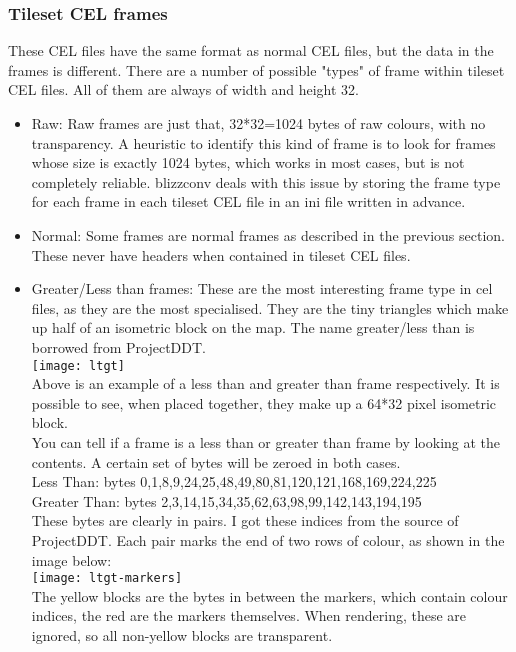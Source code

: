 \subsubsection{Tileset CEL frames}
	These CEL files have the same format as normal CEL files, but the data in the frames is different. There are a number of possible "types" of frame within tileset CEL files. All of them are always of width and height 32.
\begin{itemize}

	\item{Raw:} Raw frames are just that, 32*32=1024 bytes of raw colours, with no transparency. A heuristic to identify this kind of frame is to look for frames whose size is exactly 1024 bytes,  which works in most cases, but is not completely reliable. blizzconv\cite{blizzconv} deals with this issue by storing the frame type for each frame in each tileset CEL file in an ini file written in advance.
	
	\item{Normal:} Some frames are normal frames as described in the previous section. These never have headers when contained in tileset CEL files.
	
	\item{Greater/Less than frames:} These are the most interesting frame type in cel files, as they are the most specialised. They are the tiny triangles which make up half of an isometric block on the map. The name greater/less than is borrowed from ProjectDDT\cite{ddt}. \\
\texttt{[image: ltgt]}\\ Above is an example of a less than and greater than frame respectively. It is possible to  see, when placed together, they make up a 64*32 pixel isometric block.\\
You can tell if a frame is a less than or greater than frame by looking at the contents. A certain set of bytes will be zeroed in both cases.\\
Less Than: bytes 0,1,8,9,24,25,48,49,80,81,120,121,168,169,224,225\\
Greater Than: bytes 2,3,14,15,34,35,62,63,98,99,142,143,194,195\\

	These bytes are clearly in pairs. I got these indices from the source of ProjectDDT\cite{ddt}. Each pair marks the end of two rows of colour, as shown in the image below:\\
\texttt{[image: ltgt-markers]}\\
The yellow blocks are the bytes in between the markers, which contain colour indices, the red are the markers themselves. When rendering, these are ignored, so all non-yellow blocks are transparent.


\end{itemize}
